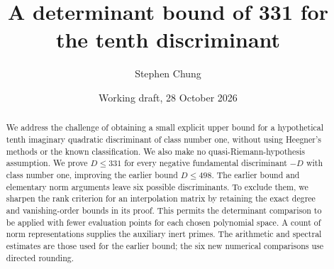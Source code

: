 \documentclass[11pt,reqno]{amsart}
\title[A determinant bound for the tenth discriminant]{A determinant bound of 331 for the tenth discriminant}
\author[Stephen Chung]{Stephen Chung}
\date{Working draft, 28 October 2026}
\numberwithin{equation}{section}
\theoremstyle{remark}
\begin{document}
\begin{abstract}
We address the challenge of obtaining a small explicit upper bound for a
hypothetical tenth imaginary quadratic discriminant of class number one,
without using Heegner's methods or the known classification. We also make no quasi-Riemann-hypothesis assumption. We prove $D\leq331$ for every negative fundamental discriminant $-D$
with class number one, improving the earlier bound $D\leq498$. The earlier bound and elementary norm
arguments leave six possible discriminants. To exclude them, we sharpen the
rank criterion for an interpolation matrix by retaining the exact degree and
vanishing-order bounds in its proof. This permits the determinant comparison
to be applied with fewer evaluation points for each chosen polynomial space.
A count of norm representations supplies the auxiliary inert primes.
The arithmetic and spectral estimates are those used for the earlier bound;
the six new numerical comparisons use directed rounding.
\end{abstract}
\maketitle







\end{document}
